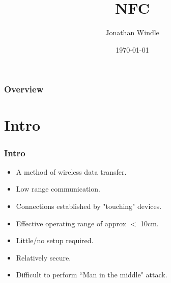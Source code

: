 \documentclass{beamer}
\title[NFC]{NFC} %
\author{Jonathan Windle} %
\institute[UEA] %
{
University of East Anglia \\ %
\medskip
\textit{J.Windle@uea.ac.uk} %
}
\date{\today} %
\begin{document}
\begin{frame}
\titlepage %
\end{frame}

\begin{frame}[allowframebreaks]
\frametitle{Overview} %
\tableofcontents %
\end{frame}

\section{Intro}
\begin{frame}
\frametitle{Intro}
\begin{itemize}
\item A method of wireless data transfer.
\item Low range communication.
\item Connections established by "touching" devices.
\item Effective operating range of approx $<$ 10cm.
\item Little/no setup required.
\item Relatively secure.
\item Difficult to perform ``Man in the middle" attack.
\end{itemize}
\end{frame}
\end{document}
